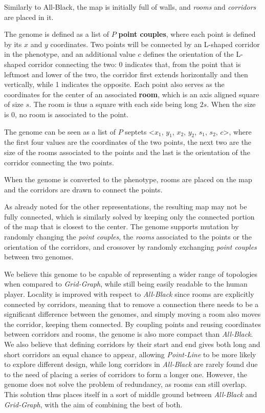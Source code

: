 Similarly to All-Black, the map is initially full of walls, and \textit{rooms} and \textit{corridors} are placed in it. 

The genome is defined as a list of $P$ \textbf{point couples}, where each point is defined by its $x$ and $y$ coordinates. Two points will be connected by an L-shaped corridor in the phenotype, and an additional value $c$ defines the orientation of the L-shaped corridor connecting the two: 0 indicates that, from the point that is leftmost and lower of the two, the corridor first extends horizontally and then vertically, while 1 indicates the opposite. Each point also serves as the coordinates for the center of an associated \textbf{room}, which is an axis aligned square of size $s$. The room is thus a square with each side being long $2s$. When the size is 0, no room is associated to the point.

The genome can be seen as a list of $P$ septets <$x_1$, $y_1$, $x_2$, $y_2$, $s_1$, $s_2$, $c$>, where the first four values are the coordinates of the two points, the next two are the size of the rooms associated to the points and the last is the orientation of the corridor connecting the two points. 

When the genome is converted to the phenotype, rooms are placed on the map and the corridors are drawn to connect the points. 

As already noted for the other representations, the resulting map may not be fully connected, which is similarly solved by keeping only the connected portion of the map that is closest to the center. The genome supports mutation by randomly changing the \textit{point couples}, the \textit{rooms} associated to the points or the orientation of the corridors, and crossover by randomly exchanging \textit{point couples} between two genomes.

We believe this genome to be capable of representing a wider range of topologies when compared to \textit{Grid-Graph}, while still being easily readable to the human player. Locality is improved with respect to \textit{All-Black} since rooms are explicitly connected by corridors, meaning that to remove a connection there needs to be a significant difference between the genomes, and simply moving a room also moves the corridor, keeping them connected. By coupling points and reusing coordinates between corridors and rooms, the genome is also more compact than \textit{All-Black}. We also believe that defining corridors by their start and end gives both long and short corridors an equal chance to appear, allowing \textit{Point-Line} to be more likely to explore different design, while long corridors in \textit{All-Black} are rarely found due to the need of placing a series of corridors to form a longer one.  However, the genome does not solve the problem of redundancy, as rooms can still overlap. This solution thus places itself in a sort of middle ground between \textit{All-Black} and \textit{Grid-Graph}, with the aim of combining the best of both.

